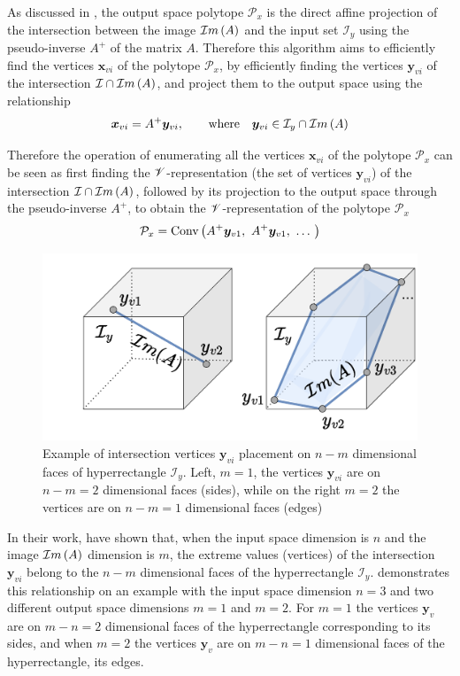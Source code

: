 As discussed in , the output space polytope $\mathcal{P}_x$ is the direct affine projection of the intersection between the image $\mathcal{I}m\left(A\right)$ and the input set $\mathcal{I}_y$ using the pseudo-inverse $A^+$ of the matrix $A$. Therefore this algorithm aims to efficiently find the vertices $\bm{x}_{vi}$ of the polytope $\mathcal{P}_x$, by efficiently finding the vertices $\bm{y}_{vi}$ of the intersection $\mathcal{I}\cap \mathcal{I}m\left(A\right)$, and project them to the output space using the relationship
\begin{equation}
    \bm{x}_{vi} = A^{+}\bm{y}_{vi}, \qquad \text{where} \quad \bm{y}_{vi}\in\mathcal{I}_y\cap \mathcal{I}m\left(A\right) \label{eq:compute_vert}
\end{equation}

Therefore the operation of enumerating all the vertices $\bm{x}_{vi}$ of the polytope $\mathcal{P}_x$ can be seen as first finding the $\mathscr{V}$-representation (the set of vertices $\bm{y}_{vi}$) of the intersection  $\mathcal{I}\cap \mathcal{I}m\left(A\right)$, followed by its projection to the output space through the pseudo-inverse $A^+$, to obtain the $\mathscr{V}$-representation of the polytope $\mathcal{P}_x$
\begin{equation}
    \mathcal{P}_x = \text{Conv}\left(A^+\bm{y}_{v1},~A^+\bm{y}_{v1},~\ldots~ \right)
\end{equation}

\begin{figure}
\vspace{-0.5cm}
    \centering
    \includegraphics[width=\linewidth]{Papers/images/intersetcion_size.pdf}
    \caption{Example of intersection vertices $\bm{y}_{vi}$ placement on $n\!-\!m$ dimensional faces of hyperrectangle $\mathcal{I}_y$. Left, $m=1$, the vertices $\bm{y}_{vi}$ are on $n\!-\!m\!=\!2$ dimensional faces (sides), while on the right $m=2$ the vertices are on $n\!-\!m\!=\!1$ dimensional faces (edges) }
    \label{fig:size_inter}
\end{figure}
In their work, \citet{sasaki2011vertex} have shown that, when the input space dimension is $n$ and the image $\mathcal{I}m\left(A\right)$ dimension is $m$, the extreme values (vertices) of the intersection $\bm{y}_{vi}$ belong to the $n-  m$ dimensional faces of the hyperrectangle $\mathcal{I}_y$.  demonstrates this relationship on an example with the input space dimension $n=3$ and two different output space dimensions $m=1$ and $m=2$. For $m=1$ the vertices $\bm{y}_{v}$ are on $m-n=2$ dimensional faces of the hyperrectangle corresponding to its sides, and when $m=2$ the vertices  $\bm{y}_{v}$ are on $m-n=1$ dimensional faces of the hyperrectangle, its edges.

